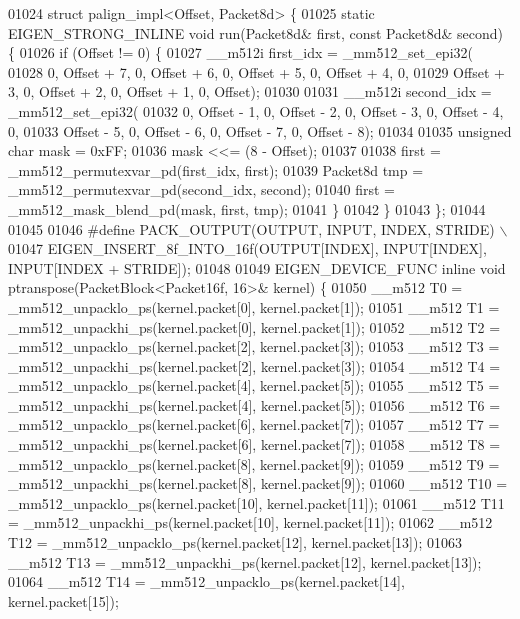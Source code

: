 \begin{DoxyCode}
01024 \textcolor{keyword}{struct }palign\_impl<Offset, Packet8d> \{
01025   \textcolor{keyword}{static} EIGEN\_STRONG\_INLINE \textcolor{keywordtype}{void} run(Packet8d& first, \textcolor{keyword}{const} Packet8d& second) \{
01026     \textcolor{keywordflow}{if} (Offset != 0) \{
01027       \_\_m512i first\_idx = \_mm512\_set\_epi32(
01028           0, Offset + 7, 0, Offset + 6, 0, Offset + 5, 0, Offset + 4, 0,
01029           Offset + 3, 0, Offset + 2, 0, Offset + 1, 0, Offset);
01030 
01031       \_\_m512i second\_idx = \_mm512\_set\_epi32(
01032           0, Offset - 1, 0, Offset - 2, 0, Offset - 3, 0, Offset - 4, 0,
01033           Offset - 5, 0, Offset - 6, 0, Offset - 7, 0, Offset - 8);
01034 
01035       \textcolor{keywordtype}{unsigned} \textcolor{keywordtype}{char} mask = 0xFF;
01036       mask <<= (8 - Offset);
01037 
01038       first = \_mm512\_permutexvar\_pd(first\_idx, first);
01039       Packet8d tmp = \_mm512\_permutexvar\_pd(second\_idx, second);
01040       first = \_mm512\_mask\_blend\_pd(mask, first, tmp);
01041     \}
01042   \}
01043 \};
01044 
01045 
01046 \textcolor{preprocessor}{#define PACK\_OUTPUT(OUTPUT, INPUT, INDEX, STRIDE) \(\backslash\)}
01047 \textcolor{preprocessor}{  EIGEN\_INSERT\_8f\_INTO\_16f(OUTPUT[INDEX], INPUT[INDEX], INPUT[INDEX + STRIDE]);}
01048 
01049 EIGEN\_DEVICE\_FUNC \textcolor{keyword}{inline} \textcolor{keywordtype}{void} ptranspose(PacketBlock<Packet16f, 16>& kernel) \{
01050   \_\_m512 T0 = \_mm512\_unpacklo\_ps(kernel.packet[0], kernel.packet[1]);
01051   \_\_m512 T1 = \_mm512\_unpackhi\_ps(kernel.packet[0], kernel.packet[1]);
01052   \_\_m512 T2 = \_mm512\_unpacklo\_ps(kernel.packet[2], kernel.packet[3]);
01053   \_\_m512 T3 = \_mm512\_unpackhi\_ps(kernel.packet[2], kernel.packet[3]);
01054   \_\_m512 T4 = \_mm512\_unpacklo\_ps(kernel.packet[4], kernel.packet[5]);
01055   \_\_m512 T5 = \_mm512\_unpackhi\_ps(kernel.packet[4], kernel.packet[5]);
01056   \_\_m512 T6 = \_mm512\_unpacklo\_ps(kernel.packet[6], kernel.packet[7]);
01057   \_\_m512 T7 = \_mm512\_unpackhi\_ps(kernel.packet[6], kernel.packet[7]);
01058   \_\_m512 T8 = \_mm512\_unpacklo\_ps(kernel.packet[8], kernel.packet[9]);
01059   \_\_m512 T9 = \_mm512\_unpackhi\_ps(kernel.packet[8], kernel.packet[9]);
01060   \_\_m512 T10 = \_mm512\_unpacklo\_ps(kernel.packet[10], kernel.packet[11]);
01061   \_\_m512 T11 = \_mm512\_unpackhi\_ps(kernel.packet[10], kernel.packet[11]);
01062   \_\_m512 T12 = \_mm512\_unpacklo\_ps(kernel.packet[12], kernel.packet[13]);
01063   \_\_m512 T13 = \_mm512\_unpackhi\_ps(kernel.packet[12], kernel.packet[13]);
01064   \_\_m512 T14 = \_mm512\_unpacklo\_ps(kernel.packet[14], kernel.packet[15]);

\end{DoxyCode}
